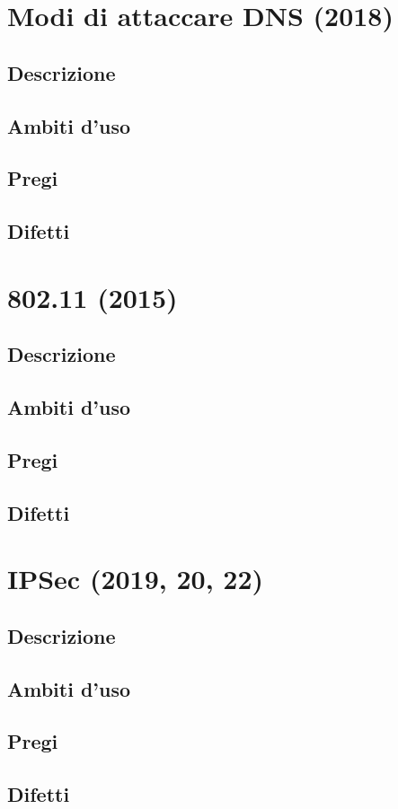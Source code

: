 \documentclass[10pt,oneside,a4paper]{article}
\begin{document}
\section{Modi di attaccare DNS (2018)}
\subsection{Descrizione}
\subsection{Ambiti d'uso}
\subsection{Pregi}
\subsection{Difetti}
\section{802.11 (2015)}
\subsection{Descrizione}
\subsection{Ambiti d'uso}
\subsection{Pregi}
\subsection{Difetti}
\section{IPSec (2019, 20, 22)}
\subsection{Descrizione}
\subsection{Ambiti d'uso}
\subsection{Pregi}
\subsection{Difetti}
\end{document}

